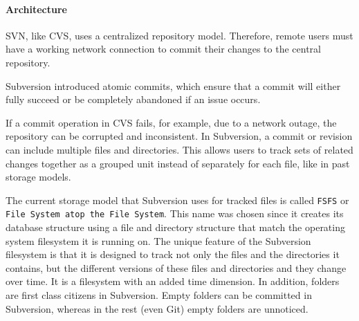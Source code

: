 \paragraph{Architecture}


SVN, like CVS, uses a centralized repository model. Therefore, remote users must have a working network connection to commit their changes to the central repository.

Subversion introduced atomic commits, which ensure that a commit will either fully succeed or be completely abandoned if an issue occurs.


If a commit operation in CVS fails, for example, due to a network outage, the repository can be corrupted and inconsistent. In Subversion, a commit or revision can include multiple files and directories. This allows users to track sets of related changes together as a grouped unit instead of separately for each file, like in past storage models.

The current storage model that Subversion uses for tracked files is called \lstinline{FSFS} or \lstinline{File System atop the File System}. This name was chosen since it creates its database structure using a file and directory structure that match the operating system filesystem it is running on. The unique feature of the Subversion filesystem is that it is designed to track not only the files and the directories it contains, but the different versions of these files and directories and they change over time. It is a filesystem with an added time dimension. In addition, folders are first class citizens in Subversion. Empty folders can be committed in Subversion, whereas in the rest (even Git) empty folders are unnoticed.

